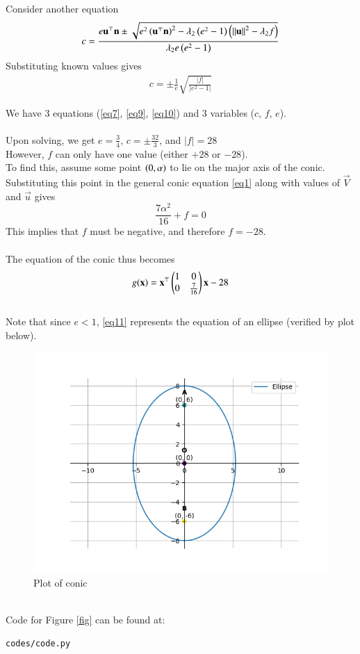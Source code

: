 \documentclass[journal]{IEEEtran}
\begin{document}
Consider another equation $$c=\frac{e\mathbf{u}^\top\mathbf{n}\pm\sqrt{e^2\left(\mathbf{u}^\top\mathbf{n}\right)^2-\lambda_2\left(e^2-1\right)\left(\left\lVert\mathbf{u}\right\rVert^2-\lambda_2f\right)}}{\lambda_2e\left(e^2-1\right)}$$
Substituting known values gives
\begin{align}
c=\pm\frac{1}{e}\sqrt{\frac{|f|}{|e^2-1|}} \label{eq10}
\end{align}

We have 3 equations (\ref{eq7}, \ref{eq9}, \ref{eq10}) and 3 variables ($c$, $f$, $e$).
\\ \\
Upon solving, we get $e=\frac{3}{4}$, $c=\pm\frac{32}{3}$, and $|f|=28$
\\
However, $f$ can only have one value (either $+28$ or $-28$).
\\
To find this, assume some point $\left(0,\alpha\right)$ to lie on the major axis of the conic. Substituting this point in the general conic equation \ref{eq1} along with values of $\vec{V}$ and $\vec{u}$ gives $$\frac{7\alpha^2}{16}+f=0$$
This implies that $f$ must be negative, and therefore $f=-28$.
\\ \\
The equation of the conic thus becomes 
\begin{align}
g(\mathbf{x}) = \mathbf{x}^\top\begin{pmatrix}1&0\\0&\frac{7}{16}\end{pmatrix}\mathbf{x}-28 \label{eq11}
\end{align}
\\
Note that since $e<1$, \eqref{eq11} represents the equation of an ellipse (verified by plot below).
\\
\begin{figure}[h]
	\centering
	\includegraphics[width=\columnwidth]{figs/fig.png}
	\caption{Plot of conic}
	\label{fig:fig}
\end{figure}
\\
Code for Figure \eqref{fig} can be found at:
\begin{lstlisting}
codes/code.py
\end{lstlisting}
\end{document}
